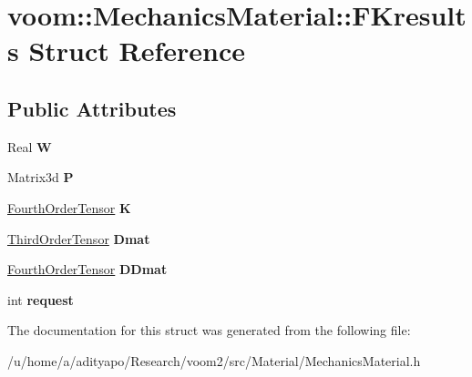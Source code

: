 \hypertarget{structvoom_1_1_mechanics_material_1_1_f_kresults}{
\section{voom::MechanicsMaterial::FKresults Struct Reference}
\label{structvoom_1_1_mechanics_material_1_1_f_kresults}
}
\subsection*{Public Attributes}
\begin{DoxyCompactItemize}
\item 
\hypertarget{structvoom_1_1_mechanics_material_1_1_f_kresults_ae92fe3d359d9802327d63e5af0842277}{
Real {\bfseries W}}
\label{structvoom_1_1_mechanics_material_1_1_f_kresults_ae92fe3d359d9802327d63e5af0842277}

\item 
\hypertarget{structvoom_1_1_mechanics_material_1_1_f_kresults_acba4fc986eabebcfdc174e9e366b66e9}{
Matrix3d {\bfseries P}}
\label{structvoom_1_1_mechanics_material_1_1_f_kresults_acba4fc986eabebcfdc174e9e366b66e9}

\item 
\hypertarget{structvoom_1_1_mechanics_material_1_1_f_kresults_a26b9d1c5d2cab669ee8fd113257aba8b}{
\hyperlink{classvoom_1_1_fourth_order_tensor}{FourthOrderTensor} {\bfseries K}}
\label{structvoom_1_1_mechanics_material_1_1_f_kresults_a26b9d1c5d2cab669ee8fd113257aba8b}

\item 
\hypertarget{structvoom_1_1_mechanics_material_1_1_f_kresults_adda72c38bacf7c94216896007bfbe692}{
\hyperlink{classvoom_1_1_third_order_tensor}{ThirdOrderTensor} {\bfseries Dmat}}
\label{structvoom_1_1_mechanics_material_1_1_f_kresults_adda72c38bacf7c94216896007bfbe692}

\item 
\hypertarget{structvoom_1_1_mechanics_material_1_1_f_kresults_a13f698f0e65a0ab3377a0c60d17e0b9e}{
\hyperlink{classvoom_1_1_fourth_order_tensor}{FourthOrderTensor} {\bfseries DDmat}}
\label{structvoom_1_1_mechanics_material_1_1_f_kresults_a13f698f0e65a0ab3377a0c60d17e0b9e}

\item 
\hypertarget{structvoom_1_1_mechanics_material_1_1_f_kresults_a45815013b5540fbd8b3d69beccb0e6f2}{
int {\bfseries request}}
\label{structvoom_1_1_mechanics_material_1_1_f_kresults_a45815013b5540fbd8b3d69beccb0e6f2}

\end{DoxyCompactItemize}


The documentation for this struct was generated from the following file:\begin{DoxyCompactItemize}
\item 
/u/home/a/adityapo/Research/voom2/src/Material/MechanicsMaterial.h\end{DoxyCompactItemize}
